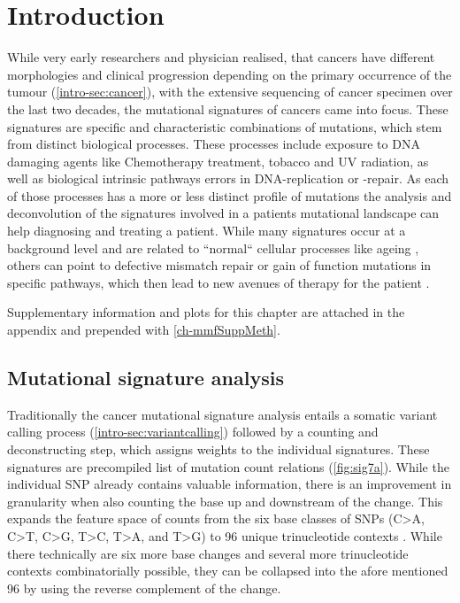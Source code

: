 \section{Introduction}
\label{mmf-sec:intro}

While very early researchers and physician realised, that cancers have different morphologies and clinical progression depending on the primary occurrence of the tumour (\autoref{intro-sec:cancer}), with the extensive sequencing of cancer specimen over the last two decades, the mutational signatures of cancers came into focus. These signatures are specific and characteristic combinations of mutations, which stem from distinct biological processes. These processes include exposure to DNA damaging agents like Chemotherapy treatment, tobacco and UV radiation, as well as biological intrinsic pathways errors in DNA-replication or -repair. As each of those processes has a more or less distinct profile of mutations \cite{Hollstein1991,Kucab2019} the analysis and deconvolution of the signatures involved in a patients mutational landscape can help diagnosing and treating a patient. While many signatures occur at a background level and are related to ``normal`` cellular processes like ageing \cite{Alexandrov2013}, others can point to defective mismatch repair or gain of function mutations in specific pathways, which then lead to new avenues of therapy for the patient \cite{Neil2017}.

Supplementary information and plots for this chapter are attached in the appendix and prepended with \ref{ch-mmfSuppMeth}.

\subsection{Mutational signature analysis}
\label{mmf-sec:signatureanalysis}
Traditionally the cancer mutational signature analysis entails a somatic variant calling process (\autoref{intro-sec:variantcalling}) followed by a counting and deconstructing step, which assigns weights to the individual signatures. These signatures are precompiled list of mutation count relations (\autoref{fig:sig7a}). While the individual SNP already contains valuable information, there is an improvement in granularity when also counting the base up and downstream of the change. This expands the feature space of counts from the six base classes of SNPs (C>A, C>T, C>G, T>C, T>A, and T>G) to 96 unique trinucleotide contexts \cite{Alexandrov2013}. While there technically are six more base changes and several  more trinucleotide contexts combinatorially possible, they can be collapsed into the afore mentioned 96 by using the reverse complement of the change.

